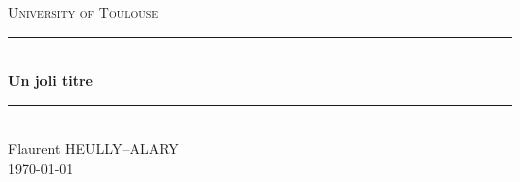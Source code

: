 \documentclass[12pt]{report}
\numberwithin{equation}{section}
\newcommand{\noun}[1]{\textsc{#1}}
\begin{document}

\begin{titlepage}
\newcommand{\HRule}{\rule{\linewidth}{0.5mm}}
\center
\textsc{\LARGE
	University of Toulouse
} \\[1cm]
\HRule\\[0.4cm]
{ \huge \bfseries Un joli titre \\[0.15cm] }
\HRule\\[1.5cm]
Flaurent HEULLY--ALARY
\\[1cm]
\today \\ [1cm]
\end{titlepage}
\begin{center}
\thispagestyle{plain}
\par\end{center}
\large
\tableofcontents
\newpage
\thispagestyle{empty}
\listoffigures
\listoftables
\newpage
\end{document}
